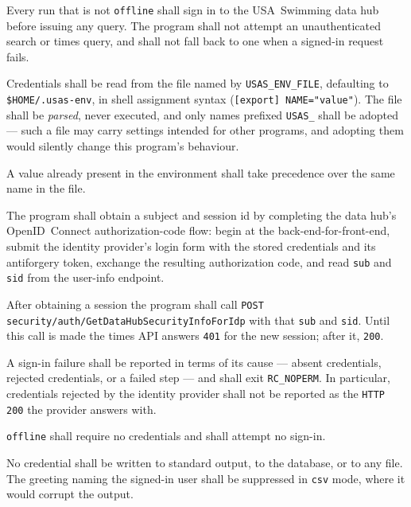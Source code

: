 \documentclass[12pt]{article}
\newcommand{\code}[1]{\texttt{#1}}
\newcommand{\req}[1]{\textbf{[#1]}}
\begin{document}
\begin{description}[style=nextline]
  \item[\req{REQ-N-01}] Every run that is not \code{offline} shall sign
        in to the USA~Swimming data hub before issuing any query.  The
        program shall not attempt an unauthenticated search or times
        query, and shall not fall back to one when a signed-in request
        fails.
  \item[\req{REQ-N-02}] Credentials shall be read from the file named
        by \code{USAS\_ENV\_FILE}, defaulting to
        \code{\$HOME/.usas-env}, in shell assignment syntax
        (\code{[export] NAME="value"}).  The file shall be
        \emph{parsed}, never executed, and only names prefixed
        \code{USAS\_} shall be adopted --- such a file may carry
        settings intended for other programs, and adopting them would
        silently change this program's behaviour.
  \item[\req{REQ-N-03}] A value already present in the environment
        shall take precedence over the same name in the file.
  \item[\req{REQ-N-04}] The program shall obtain a subject and session
        id by completing the data hub's OpenID~Connect
        authorization-code flow: begin at the back-end-for-front-end,
        submit the identity provider's login form with the stored
        credentials and its antiforgery token, exchange the resulting
        authorization code, and read \code{sub} and \code{sid} from the
        user-info endpoint.
  \item[\req{REQ-N-05}] After obtaining a session the program shall
        call \code{POST security/auth/GetDataHubSecurityInfoForIdp}
        with that \code{sub} and \code{sid}.  Until this call is made
        the times API answers \code{401} for the new session; after it,
        \code{200}.
  \item[\req{REQ-N-06}] A sign-in failure shall be reported in terms of
        its cause --- absent credentials, rejected credentials, or a
        failed step --- and shall exit \code{RC\_NOPERM}.  In
        particular, credentials rejected by the identity provider shall
        not be reported as the \code{HTTP 200} the provider answers
        with.
  \item[\req{REQ-N-07}] \code{offline} shall require no credentials and
        shall attempt no sign-in.
  \item[\req{REQ-N-08}] No credential shall be written to standard
        output, to the database, or to any file.  The greeting naming
        the signed-in user shall be suppressed in \code{csv} mode,
        where it would corrupt the output.
\end{description}
\end{document}
